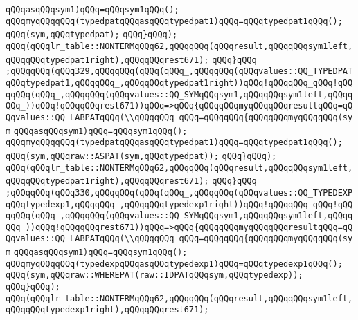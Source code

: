 \verb|qQQqasqQQqsym1)qQQq=qQQqsym1qQQq();|\newline
\verb|qQQqmyqQQqqQQq(typedpatqQQqasqQQqtypedpat1)qQQq=qQQqtypedpat1qQQq();|\newline
\verb|qQQq(sym,qQQqtypedpat);|\newline
\verb|qQQq}qQQq);|\newline
\verb|qQQq(qQQqlr_table::NONTERMqQQq62,qQQqqQQq(qQQqresult,qQQqqQQqsym1left,qQQqqQQqtypedpat1right),qQQqqQQqrest671);|\newline
\verb|qQQq}qQQq|\newline
\verb|;qQQqqQQq(qQQq329,qQQqqQQq(qQQq(qQQq_,qQQqqQQq(qQQqvalues::QQ_TYPEDPATqQQqtypedpat1,qQQqqQQq_,qQQqqQQqtypedpat1right))qQQq!qQQqqQQq_qQQq!qQQqqQQq(qQQq_,qQQqqQQq(qQQqvalues::QQ_SYMqQQqsym1,qQQqqQQqsym1left,qQQqqQQq_))qQQq!qQQqqQQqrest671))qQQq=>qQQq{qQQqqQQqmyqQQqqQQqresultqQQq=qQQqvalues::QQ_LABPATqQQq(\\qQQqqQQq_qQQq=qQQqqQQq{qQQqqQQqmyqQQqqQQq(sym|\newline
\verb|qQQqasqQQqsym1)qQQq=qQQqsym1qQQq();|\newline
\verb|qQQqmyqQQqqQQq(typedpatqQQqasqQQqtypedpat1)qQQq=qQQqtypedpat1qQQq();|\newline
\verb|qQQq(sym,qQQqraw::ASPAT(sym,qQQqtypedpat));|\newline
\verb|qQQq}qQQq);|\newline
\verb|qQQq(qQQqlr_table::NONTERMqQQq62,qQQqqQQq(qQQqresult,qQQqqQQqsym1left,qQQqqQQqtypedpat1right),qQQqqQQqrest671);|\newline
\verb|qQQq}qQQq|\newline
\verb|;qQQqqQQq(qQQq330,qQQqqQQq(qQQq(qQQq_,qQQqqQQq(qQQqvalues::QQ_TYPEDEXPqQQqtypedexp1,qQQqqQQq_,qQQqqQQqtypedexp1right))qQQq!qQQqqQQq_qQQq!qQQqqQQq(qQQq_,qQQqqQQq(qQQqvalues::QQ_SYMqQQqsym1,qQQqqQQqsym1left,qQQqqQQq_))qQQq!qQQqqQQqrest671))qQQq=>qQQq{qQQqqQQqmyqQQqqQQqresultqQQq=qQQqvalues::QQ_LABPATqQQq(\\qQQqqQQq_qQQq=qQQqqQQq{qQQqqQQqmyqQQqqQQq(sym|\newline
\verb|qQQqasqQQqsym1)qQQq=qQQqsym1qQQq();|\newline
\verb|qQQqmyqQQqqQQq(typedexpqQQqasqQQqtypedexp1)qQQq=qQQqtypedexp1qQQq();|\newline
\verb|qQQq(sym,qQQqraw::WHEREPAT(raw::IDPATqQQqsym,qQQqtypedexp));|\newline
\verb|qQQq}qQQq);|\newline
\verb|qQQq(qQQqlr_table::NONTERMqQQq62,qQQqqQQq(qQQqresult,qQQqqQQqsym1left,qQQqqQQqtypedexp1right),qQQqqQQqrest671);|\newline
